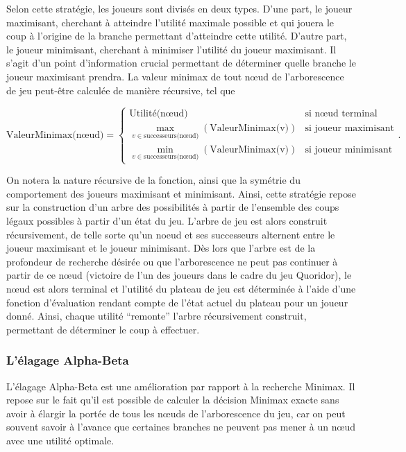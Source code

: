 \documentclass[11pt]{article}
\begin{document}
Selon cette stratégie, les joueurs sont divisés en deux types. D'une part, le joueur maximisant, cherchant à atteindre l’utilité maximale possible et qui jouera le coup à l'origine de la branche permettant d’atteindre cette utilité. D’autre part, le joueur minimisant, cherchant à minimiser l’utilité du joueur maximisant. Il s’agit d’un point d’information crucial permettant de déterminer quelle branche le joueur maximisant prendra. La valeur minimax de tout nœud de l'arborescence de jeu peut-être calculée de manière récursive, tel que

\begin{equation}
    \text{ValeurMinimax(n\oe ud)}=\left\{
    \begin{matrix}
        \text{Utilit\'e(n\oe ud)} & \text{si n\oe ud terminal}\\ 
        \underset{v \in \text{successeurs(n\oe ud)}}{\max}\left ( \text{ValeurMinimax(v)} \right ) & \text{si joueur maximisant}\\ 
        \underset{v \in \text{successeurs(n\oe ud)}}{\min}\left ( \text{ValeurMinimax(v)} \right ) & \text{si joueur minimisant}
    \end{matrix}
    \right. .
\end{equation}

On notera la nature récursive de la fonction, ainsi que la symétrie du comportement des joueurs maximisant et minimisant. Ainsi, cette stratégie repose sur la construction d'un arbre des possibilités à partir de l'ensemble des coups légaux possibles à partir d'un état du jeu. L'arbre de jeu est alors construit récursivement, de telle sorte qu'un noeud et ses successeurs alternent entre le joueur maximisant et le joueur minimisant. Dès lors que l'arbre est de la profondeur de recherche désirée ou que l’arborescence ne peut pas continuer à partir de ce nœud (victoire de l'un des joueurs dans le cadre du jeu Quoridor), le n\oe ud est alors terminal et l’utilité du plateau de jeu est déterminée à l’aide d’une fonction d'évaluation rendant compte de l’état actuel du plateau pour un joueur donné. Ainsi, chaque utilité “remonte” l'arbre récursivement construit, permettant de déterminer le coup à effectuer.

\subsubsection{L'élagage Alpha-Beta}

L’élagage Alpha-Beta \cite{alphaBeta} est une amélioration par rapport à la recherche Minimax. Il repose sur le fait qu’il est possible de calculer la décision Minimax exacte sans avoir à élargir la portée de tous les nœuds de l’arborescence du jeu, car on peut souvent savoir à l’avance que certaines branches ne peuvent pas mener à un nœud avec une utilité optimale. 
\end{document}
